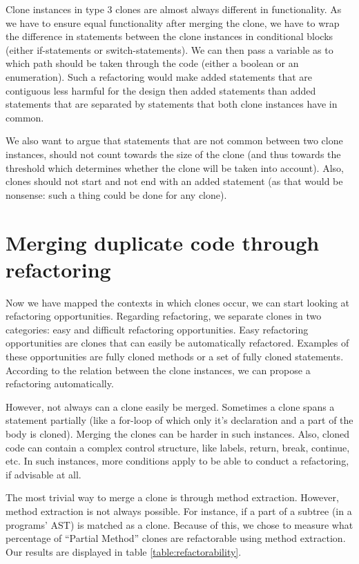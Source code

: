 \documentclass[a4paper]{article}
\begin{document}
Clone instances in type 3 clones are almost always different in functionality. As we have to ensure equal functionality after merging the clone, we have to wrap the difference in statements between the clone instances in conditional blocks (either if-statements or switch-statements). We can then pass a variable as to which path should be taken through the code (either a boolean or an enumeration). Such a refactoring would make added statements that are contiguous less harmful for the design then added statements than added statements that are separated by statements that both clone instances have in common.

We also want to argue that statements that are not common between two clone instances, should not count towards the size of the clone (and thus towards the threshold which determines whether the clone will be taken into account). Also, clones should not start and not end with an added statement (as that would be nonsense: such a thing could be done for any clone).

\section{Merging duplicate code through refactoring}
Now we have mapped the contexts in which clones occur, we can start looking at refactoring opportunities. Regarding refactoring, we separate clones in two categories: easy and difficult refactoring opportunities. Easy refactoring opportunities are clones that can easily be automatically refactored. Examples of these opportunities are fully cloned methods or a set of fully cloned statements. According to the relation between the clone instances, we can propose a refactoring automatically.

However, not always can a clone easily be merged. Sometimes a clone spans a statement partially (like a for-loop of which only it's declaration and a part of the body is cloned). Merging the clones can be harder in such instances. Also, cloned code can contain a complex control structure, like labels, return, break, continue, etc. In such instances, more conditions apply to be able to conduct a refactoring, if advisable at all.

The most trivial way to merge a clone is through method extraction. However, method extraction is not always possible. For instance, if a part of a subtree (in a programs' AST) is matched as a clone. Because of this, we chose to measure what percentage of ``Partial Method'' clones are refactorable using method extraction. Our results are displayed in table \ref{table:refactorability}.
\end{document}

